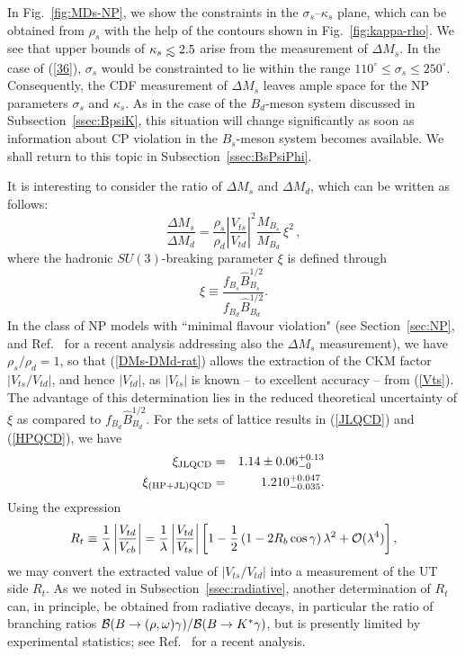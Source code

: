 \documentclass[11pt]{cernrep}
\newcommand{\lsim}{
\mathrel{\hbox{\rlap{\hbox{\lower4pt\hbox{$\sim$}}}\hbox{$<$}}}}
\begin{document}
In Fig.~\ref{fig:MDs-NP}, we show the constraints in the $\sigma_s$--$\kappa_s$ 
plane, which can be obtained from $\rho_s$ with the help of the contours
shown in Fig.~\ref{fig:kappa-rho}. We see that  upper bounds of $\kappa_s\lsim 2.5$
arise from the measurement of $\Delta M_s$. In the case of (\ref{36}), 
$\sigma_s$ would be constrainted to lie within the range 
$110^\circ\leq\sigma_s\leq250^\circ$. Consequently, the CDF measurement of 
$\Delta M_s$ leaves ample space for the NP parameters $\sigma_s$ and 
$\kappa_s$. As in the case of the $B_d$-meson system discussed in
Subsection~\ref{ssec:BpsiK}, this situation will change significantly 
as soon as information about CP violation in the $B_s$-meson system becomes
available. We shall return to this topic in Subsection~\ref{ssec:BsPsiPhi}.

It is interesting to consider the ratio of $\Delta M_s$ and $\Delta M_d$,
which can be written as follows:
\begin{equation}\label{DMs-DMd-rat}
\frac{\Delta M_s}{\Delta M_d} =  \frac{\rho_s}{\rho_d}
\left|\frac{V_{ts}}{V_{td}}\right|^2 \frac{M_{B_s}}{M_{B_d}}\, \xi^2\,,
\end{equation}
where the hadronic $SU(3)$-breaking parameter $\xi$ is defined  through
\begin{equation}
\xi \equiv 
\frac{f_{B_s}\hat{B}_{B_s}^{1/2}}{f_{B_d}\hat{B}_{B_d}^{1/2}}.
\end{equation}
In the class of NP models with
``minimal flavour violation" (see Section~\ref{sec:NP}, and Ref.~\cite{BBGT} for 
a recent analysis addressing also the $\Delta M_s$ measurement), 
we have $\rho_s/\rho_d=1$, so that (\ref{DMs-DMd-rat}) 
allows the extraction of the CKM factor $|V_{ts}/V_{td}|$, and hence
$|V_{td}|$, as $|V_{ts}|$ is known -- to excellent accuracy -- from (\ref{Vts}). The advantage of this determination lies in the reduced theoretical uncertainty of $\xi$ as compared to $f_{B_d}\hat B_{B_d}^{1/2}$. For the sets of lattice results in
(\ref{JLQCD}) and (\ref{HPQCD}), we have
\begin{eqnarray}
\xi_{\rm JLQCD} & = & 1.14\pm 0.06^{+0.13}_{-0}\label{xi-JLQCD}\\
\xi_{\rm (HP+JL)QCD} & = &
1.210^{+0.047}_{-0.035}.\label{xi-HPJL}
\end{eqnarray}
Using the expression
\begin{equation}\label{Rt-def2}
R_t \equiv \frac{1}{\lambda}\left|\frac{V_{td}}{V_{cb}}\right| 
=  \frac{1}{\lambda}\left|\frac{V_{td}}{V_{ts}}\right| \left[ 
1-\frac{1}{2}\left(1-2R_b\cos\gamma\right)\lambda^2+{\cal O}(\lambda^4)\right],
\end{equation}
we may convert the extracted value of $|V_{ts}/V_{td}|$ into a measurement of the UT
side $R_t$. As we noted in Subsection~\ref{ssec:radiative}, another determination of $R_t$ can, in principle, be obtained from radiative decays, in particular the ratio of 
branching ratios ${\cal B}(B\to (\rho,\omega)\gamma)/{\cal B}(B\to K^*\gamma)$, 
but is presently limited by experimental statistics; see Ref.~\cite{VtdVts} for a 
recent analysis. 
\end{document}
